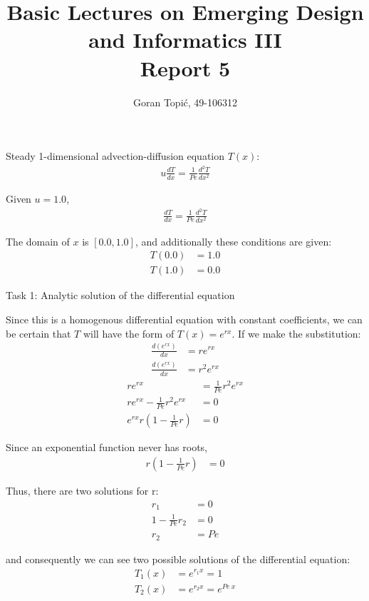 \documentclass{article}
\begin{document}
\title{Basic Lectures on Emerging Design and Informatics III\\
Report 5}

\author{Goran Topi\'{c}, 49-106312}
\maketitle

Steady 1-dimensional advection-diffusion equation $T(x)$:
\begin{align}
  u\frac{dT}{dx} = \frac{1}{Pe}\frac{d^2 T}{dx^2}
\end{align}

Given $u=1.0$,
\begin{align}
  \frac{dT}{dx} = \frac{1}{Pe}\frac{d^2 T}{dx^2}
\end{align}

The domain of $x$ is $[0.0, 1.0]$, and additionally these conditions are given:
\begin{align}
  \label{cond1} T(0.0) &= 1.0 \\
  \label{cond2} T(1.0) &= 0.0
\end{align}

Task 1: Analytic solution of the differential equation

Since this is a homogenous differential equation with constant coefficients, we can be certain that $T$ will have the form of $T(x) = e^{rx}$. If we make the substitution:
\begin{align}
  \frac{d(e^{rx})}{dx} &= re^{rx} \\
  \frac{d(e^{rx})}{dx} &= r^2 e^{rx}
\end{align}
\begin{align}
  re^{rx} &= \frac{1}{Pe} r^2 e^{rx} \\
  re^{rx} - \frac{1}{Pe} r^2 e^{rx} &= 0 \\
  e^{rx} r (1 - \frac{1}{Pe} r) &= 0
\end{align}

Since an exponential function never has roots,
\begin{align}
  r (1 - \frac{1}{Pe} r) &= 0
\end{align}

Thus, there are two solutions for r:
\begin{align}
  r_1 &= 0 \\
  1 - \frac{1}{Pe} r_2 &= 0 \\
  r_2 &= Pe
\end{align}

and consequently we can see two possible solutions of the differential equation:
\begin{align}
  T_1(x) &= e^{r_1 x} = 1 \\
  T_2(x) &= e^{r_2 x} = e^{Pe~x}
\end{align}
\end{document}
